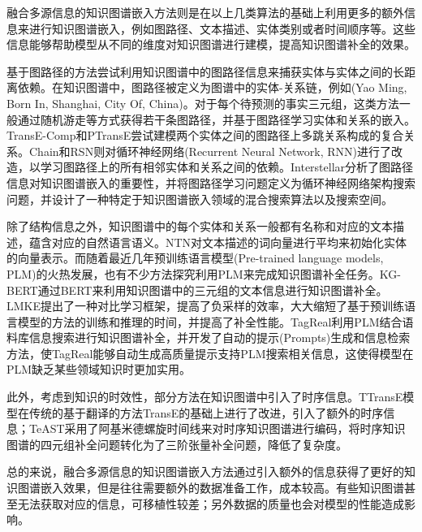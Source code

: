 融合多源信息的知识图谱嵌入方法则是在以上几类算法的基础上利用更多的额外信息来进行知识图谱嵌入，例如图路径、文本描述、实体类别或者时间顺序等。这些信息能够帮助模型从不同的维度对知识图谱进行建模，提高知识图谱补全的效果。

基于图路径的方法尝试利用知识图谱中的图路径信息来捕获实体与实体之间的长距离依赖。在知识图谱中，图路径被定义为图谱中的实体-关系链，例如(Yao Ming, Born In, Shanghai, City Of, China)。对于每个待预测的事实三元组，这类方法一般通过随机游走等方式获得若干条图路径，并基于图路径学习实体和关系的嵌入。TransE-Comp和PTransE尝试建模两个实体之间的图路径上多跳关系构成的复合关系。Chain和RSN则对循环神经网络(Recurrent Neural Network, RNN)进行了改造，以学习图路径上的所有相邻实体和关系之间的依赖。Interstellar分析了图路径信息对知识图谱嵌入的重要性，并将图路径学习问题定义为循环神经网络架构搜索问题，并设计了一种特定于知识图谱嵌入领域的混合搜索算法以及搜索空间。

除了结构信息之外，知识图谱中的每个实体和关系一般都有名称和对应的文本描述，蕴含对应的自然语言语义。NTN对文本描述的词向量进行平均来初始化实体的向量表示。而随着最近几年预训练语言模型(Pre-trained language models, PLM)的火热发展，也有不少方法探究利用PLM来完成知识图谱补全任务。KG-BERT通过BERT来利用知识图谱中的三元组的文本信息进行知识图谱补全。LMKE提出了一种对比学习框架，提高了负采样的效率，大大缩短了基于预训练语言模型的方法的训练和推理的时间，并提高了补全性能。TagReal利用PLM结合语料库信息搜索进行知识图谱补全，并开发了自动的提示(Prompts)生成和信息检索方法，使TagReal能够自动生成高质量提示支持PLM搜索相关信息，这使得模型在PLM缺乏某些领域知识时更加实用。

此外，考虑到知识的时效性，部分方法在知识图谱中引入了时序信息。TTransE模型在传统的基于翻译的方法TransE的基础上进行了改进，引入了额外的时序信息；TeAST采用了阿基米德螺旋时间线来对时序知识图谱进行编码，将时序知识图谱的四元组补全问题转化为了三阶张量补全问题，降低了复杂度。

总的来说，融合多源信息的知识图谱嵌入方法通过引入额外的信息获得了更好的知识图谱嵌入效果，但是往往需要额外的数据准备工作，成本较高。有些知识图谱甚至无法获取对应的信息，可移植性较差；另外数据的质量也会对模型的性能造成影响。

